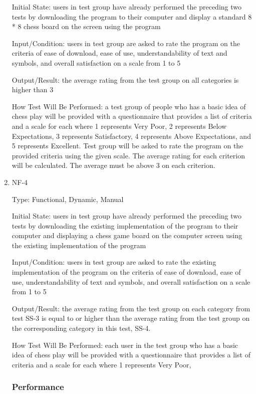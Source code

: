 \documentclass[12pt, titlepage]{article}
\begin{document}
\begin{enumerate}
Initial State: users in test group have already performed the preceding two tests by downloading the program to their computer and display a standard 8 * 8 chess board on the screen using the program

Input/Condition: users in test group are asked to rate the program on the criteria of ease of download, ease of use, understandability of text and symbols, and overall satisfaction on a scale from 1 to 5

Output/Result: the average rating from the test group on all categories is higher than 3

How Test Will Be Performed: a test group of people who has a basic idea of chess play will be provided with a questionnaire that provides a list of criteria and a scale for each where 1 represents Very Poor, 2 represents Below Expectations, 3 represents Satisfactory, 4 represents Above Expectations, and 5 represents Excellent. Test group will be asked to rate the program on the provided criteria using the given scale. The average rating for each criterion will be calculated. The average must be above 3 on each criterion.


\item{NF-4\\}

Type: Functional, Dynamic, Manual

Initial State: users in test group have already performed the preceding two tests by downloading the existing implementation of the program to their computer and displaying a chess game board on the computer screen using the existing implementation of the program

Input/Condition: users in test group are asked to rate the existing implementation of the program on the criteria of ease of download, ease of use, understandability of text and symbols, and overall satisfaction on a scale from 1 to 5

Output/Result: the average rating from the test group on each category from test SS-3 is equal to or higher than the average rating from the test group on the corresponding category in this test, SS-4.

How Test Will Be Performed: each user in the test group who has a basic idea of chess play will be provided with a questionnaire that provides a list of criteria and a scale for each where 1 represents Very Poor, 

\subsubsection{Performance}


\end{enumerate}
\end{document}
